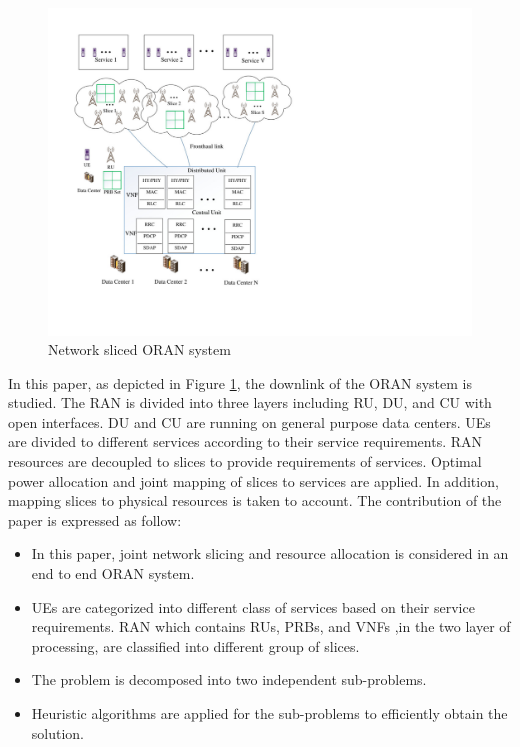 \documentclass[conference]{IEEEtran}
\begin{document}
\begin{figure}
  \centering
    \includegraphics[scale=0.55]{c8.pdf}
  \caption{Network sliced ORAN system}
  \label{fig:c11}
\end{figure}

In this paper, as  depicted in Figure \ref{fig:c11}, the downlink of the ORAN system is studied. The RAN is divided into three layers including RU, DU, and CU with open interfaces. DU and CU are running on general purpose data centers. UEs are divided to different services according to their service requirements. RAN resources are decoupled to slices to provide requirements of services. Optimal power allocation and joint mapping of slices to services are applied. In addition, mapping slices to physical resources is taken to account. The contribution of the paper is expressed as follow:
\begin{itemize}
\item In this paper, joint network slicing and resource allocation is considered in an end to end ORAN system.
\item UEs are categorized into different class of services based on their service requirements. RAN which contains RUs, PRBs, and VNFs ,in the two layer of processing, are classified into different group of slices.
\item The problem is decomposed into two independent sub-problems.
\item Heuristic algorithms are applied for the sub-problems to efficiently obtain the solution.
\end{itemize}
\end{document}

